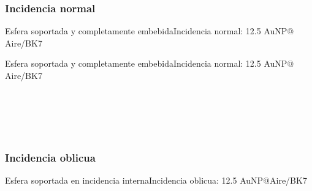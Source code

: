   \subsubsection{Incidencia normal}
    \begin{frame}{Esfera soportada y completamente embebida}{Incidencia normal: 12.5 AuNP$@$Aire/BK7}
    \begin{figure}
        \def\svgwidth{.95\textwidth}
    \end{figure}
    \end{frame}
%
    \begin{frame}{Esfera soportada y completamente embebida}{Incidencia normal: 12.5 AuNP$@$Aire/BK7}
    \begin{columns}
    \begin{figure}    \centering
        \def\svgwidth{.95\textwidth} \fontsize{4}{5}\selectfont
        \\[2em]
        \def\svgwidth{.95\textwidth}
    \end{figure}
    \begin{figure}\centering
      \def\svgwidth{.95 \textwidth}
      \tiny
    \end{figure}
    \end{columns}
    \end{frame}
%
\subsubsection{Incidencia oblicua}
    \begin{frame}{Esfera soportada en incidencia interna}{Incidencia oblicua: 12.5 AuNP$@$Aire/BK7}
    \begin{columns}
    \begin{figure}\centering
      \def\svgwidth{1 \textwidth}
    \end{figure}
    \begin{figure}    \centering \fontsize{4}{5}\selectfont
        \def\svgwidth{1\textwidth}
        \\[2em]
        \def\svgwidth{1\textwidth}
    \end{figure}
    \end{columns}
    \end{frame}
%
